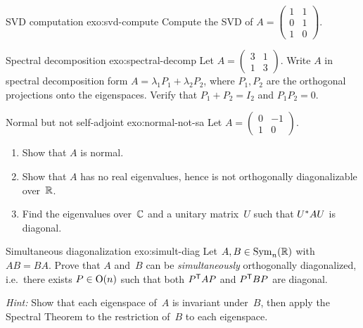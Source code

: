 \begin{exercise}{SVD computation \intermediate}{exo:svd-compute}
Compute the SVD of
$A = \begin{pmatrix} 1 & 1 \\ 0 & 1 \\ 1 & 0 \end{pmatrix}$.
\end{exercise}

\begin{exercise}{Spectral decomposition \intermediate}{exo:spectral-decomp}
Let $A = \begin{pmatrix} 3 & 1 \\ 1 & 3 \end{pmatrix}$.
Write $A$ in spectral decomposition form
$A = \lambda_1 P_1 + \lambda_2 P_2$, where $P_1,P_2$ are the
orthogonal projections onto the eigenspaces.  Verify that
$P_1+P_2 = I_2$ and $P_1P_2 = 0$.
\end{exercise}

\begin{exercise}{Normal but not self-adjoint \intermediate}{exo:normal-not-sa}
Let $A = \begin{pmatrix} 0 & -1 \\ 1 & 0 \end{pmatrix}$.
\begin{enumerate}[label=\textup{(\alph*)}]
  \item Show that $A$ is normal.
  \item Show that $A$ has no real eigenvalues, hence is not orthogonally
    diagonalizable over~${\mathbb{R}}$.
  \item Find the eigenvalues over~${\mathbb{C}}$ and a unitary matrix~$U$ such
    that ${U}^{*}AU$ is diagonal.
\end{enumerate}
\end{exercise}

\begin{exercise}{Simultaneous diagonalization \challenging}{exo:simult-diag}
Let $A,B\in\operatorname{Sym}_n({\mathbb{R}})$ with $AB=BA$.  Prove that $A$ and~$B$ can be
\emph{simultaneously} orthogonally diagonalized, i.e.\ there exists
$P\in\operatorname{O}(n)$ such that both ${P}^{\mathsf{T}}AP$ and ${P}^{\mathsf{T}}BP$
are diagonal.

\emph{Hint:} Show that each eigenspace of~$A$ is invariant under~$B$,
then apply the Spectral Theorem to the restriction of~$B$ to each
eigenspace.
\end{exercise}

